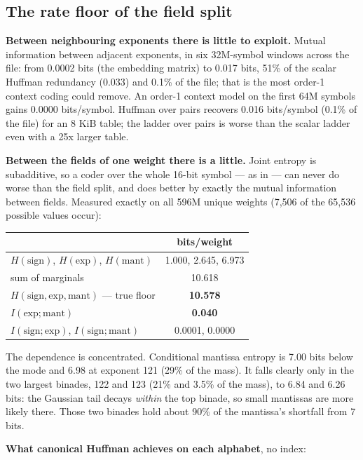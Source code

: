 \documentclass[11pt,a4paper]{article}
\newcommand{\B}[1]{\textbf{#1}}
\begin{document}
\subsection{The rate floor of the field split}\label{sec:floor}

\B{Between neighbouring exponents there is little to exploit.} Mutual information between adjacent exponents, in six 32M-symbol windows across the file: from 0.0002 bits (the embedding matrix) to 0.017 bits, 51\% of the scalar Huffman redundancy (0.033) and 0.1\% of the file; that is the most order-1 context coding could remove. An order-1 context model on the first 64M symbols gains 0.0000 bits/symbol. Huffman over pairs recovers 0.016 bits/symbol (0.1\% of the file) for an 8 KiB table; the ladder over pairs is worse than the scalar ladder even with a 25x larger table.

\B{Between the fields of one weight there is a little.} Joint entropy is subadditive, so a coder over the whole 16-bit symbol --- as in \cite{shannon} --- can never do worse than the field split, and does better by exactly the mutual information between fields. Measured exactly on all 596M unique weights (7,506 of the 65,536 possible values occur):

\begin{center}
\begin{tabular}{@{}lc@{}}
\toprule
 & bits/weight \\
\midrule
$H(\text{sign})$, $H(\text{exp})$, $H(\text{mant})$ & 1.000, 2.645, 6.973 \\
sum of marginals & 10.618 \\
$H(\text{sign},\text{exp},\text{mant})$ --- true floor & \B{10.578} \\
$I(\text{exp};\text{mant})$ & \B{0.040} \\
$I(\text{sign};\text{exp})$, $I(\text{sign};\text{mant})$ & 0.0001, 0.0000 \\
\bottomrule
\end{tabular}
\end{center}

The dependence is concentrated. Conditional mantissa entropy is 7.00 bits below the mode and 6.98 at exponent 121 (29\% of the mass). It falls clearly only in the two largest binades, 122 and 123 (21\% and 3.5\% of the mass), to 6.84 and 6.26 bits: the Gaussian tail decays \emph{within} the top binade, so small mantissas are more likely there. Those two binades hold about 90\% of the mantissa's shortfall from 7 bits.

\B{What canonical Huffman achieves on each alphabet}, no index:
\end{document}

